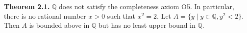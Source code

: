 \textbf{Theorem 2.1.} $\mathbb{Q}$ does not satisfy the completeness axiom O5. In particular, there is no rational number $x > 0$ such that $x^2 = 2$. Let $A = \{y \mid y \in \mathbb{Q}, y^2 < 2\}$. Then $A$ is bounded above in $\mathbb{Q}$ but has no least upper bound in $\mathbb{Q}$.
